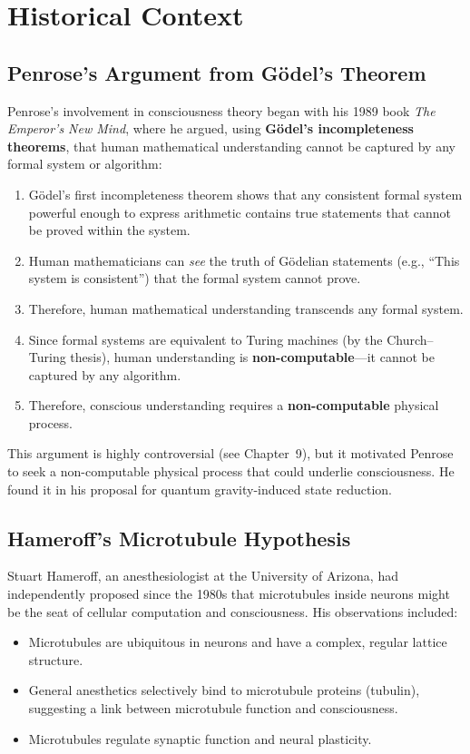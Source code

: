 \documentclass[11pt,a4paper]{report}
\begin{document}
\section{Historical Context}

\subsection{Penrose's Argument from G\"odel's Theorem}

Penrose's involvement in consciousness theory began with his 1989 book \textit{The Emperor's New Mind}, where he argued, using \textbf{G\"odel's incompleteness theorems}, that human mathematical understanding cannot be captured by any formal system or algorithm:

\begin{principlebox}
\begin{enumerate}[leftmargin=1.5em]
  \item G\"odel's first incompleteness theorem shows that any consistent formal system powerful enough to express arithmetic contains true statements that cannot be proved within the system.
  \item Human mathematicians can \emph{see} the truth of G\"odelian statements (e.g., ``This system is consistent'') that the formal system cannot prove.
  \item Therefore, human mathematical understanding transcends any formal system.
  \item Since formal systems are equivalent to Turing machines (by the Church--Turing thesis), human understanding is \textbf{non-computable}---it cannot be captured by any algorithm.
  \item Therefore, conscious understanding requires a \textbf{non-computable} physical process.
\end{enumerate}
\end{principlebox}

This argument is highly controversial (see Chapter~9), but it motivated Penrose to seek a non-computable physical process that could underlie consciousness. He found it in his proposal for quantum gravity-induced state reduction.

\subsection{Hameroff's Microtubule Hypothesis}

Stuart Hameroff, an anesthesiologist at the University of Arizona, had independently proposed since the 1980s that microtubules inside neurons might be the seat of cellular computation and consciousness. His observations included:
\begin{itemize}[leftmargin=1.5em]
  \item Microtubules are ubiquitous in neurons and have a complex, regular lattice structure.
  \item General anesthetics selectively bind to microtubule proteins (tubulin), suggesting a link between microtubule function and consciousness.
  \item Microtubules regulate synaptic function and neural plasticity.
\end{itemize}
\end{document}
